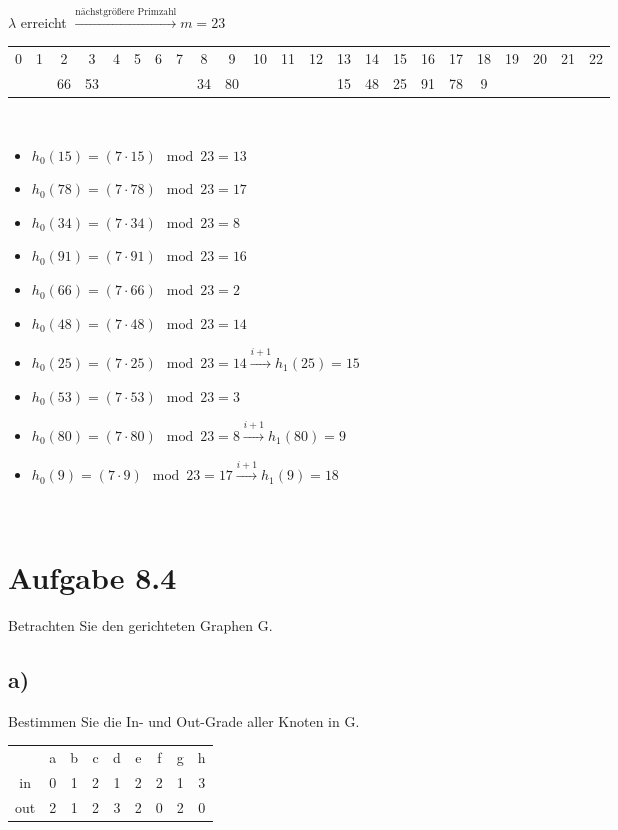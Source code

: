 \documentclass[a4paper]{article}
\begin{document}
$\lambda$ erreicht $\xrightarrow{\text{nächstgrößere Primzahl}} m = 23$\\

\begin{tabular}{c|c|c|c|c|c|c|c|c|c|c|c|c|c|c|c|c|c|c|c|c|c|c}
     0 & 1 & 2 & 3 & 4 & 5 & 6 & 7 & 8 & 9 & 10 & 11 & 12 & 13 & 14 & 15 & 16 & 17 & 18 & 19 & 20 & 21 & 22 \\
     & & 66 & 53 & & & & & 34 & 80 & & & & 15 & 48 & 25 & 91 & 78 & 9
\end{tabular}\\

\begin{itemize}
    \item $h_0(15) = (7 \cdot 15) \mod 23 = 13$
    \item $h_0(78) = (7 \cdot 78) \mod 23 = 17$
    \item $h_0(34) = (7 \cdot 34) \mod 23 = 8$
    \item $h_0(91) = (7 \cdot 91) \mod 23 = 16$
    \item $h_0(66) = (7 \cdot 66) \mod 23 = 2$
    \item $h_0(48) = (7 \cdot 48) \mod 23 = 14$
    \item $h_0(25) = (7 \cdot 25) \mod 23 = 14 \xrightarrow{i + 1} h_1(25) = 15$
    \item $h_0(53) = (7 \cdot 53) \mod 23 = 3$
    \item $h_0(80) = (7 \cdot 80) \mod 23 = 8 \xrightarrow{i + 1} h_1(80) = 9$
    \item $h_0(9) = (7 \cdot 9) \mod 23 = 17 \xrightarrow{i + 1} h_1(9) = 18$
\end{itemize}\\


\section*{Aufgabe 8.4}
Betrachten Sie den gerichteten Graphen G.

\subsection*{a)}
Bestimmen Sie die In- und Out-Grade aller Knoten in G.

\begin{tabular}{ c c c c c c c c c }
  & a & b & c & d & e & f & g & h \\ 
 in & 0 & 1 & 2 & 1 & 2 & 2 & 1 & 3 \\  
 out & 2 & 1 & 2 & 3 & 2 & 0 & 2 & 0    
\end{tabular}
\end{document}
